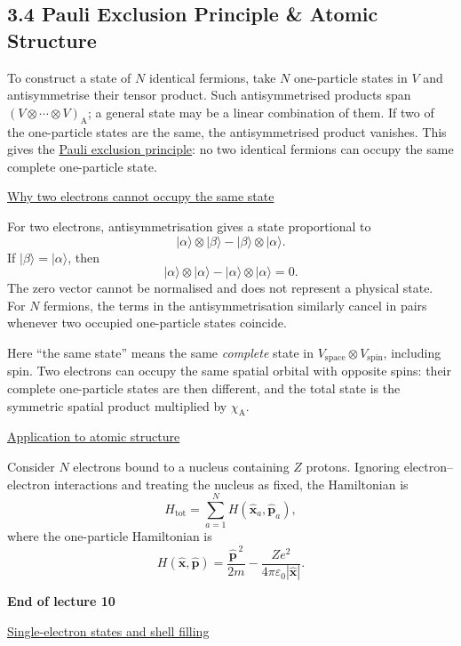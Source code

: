 \documentclass[11pt,a4paper]{article}
\begin{document}
\subsection*{3.4 Pauli Exclusion Principle \& Atomic Structure}

To construct a state of $N$ identical fermions, take $N$ one-particle
states in $V$ and antisymmetrise their tensor product. Such
antisymmetrised products span
$(V\otimes\cdots\otimes V)_{\mathrm{A}}$; a general state may be a
linear combination of them. If two of the one-particle states are
the same, the antisymmetrised product vanishes. This gives the
\underline{Pauli exclusion principle}: no two identical fermions can
occupy the same complete one-particle state.

\medskip
\noindent
\underline{Why two electrons cannot occupy the same state}

For two electrons, antisymmetrisation gives a state proportional to
\[
    |\alpha\rangle\otimes|\beta\rangle
        -|\beta\rangle\otimes|\alpha\rangle.
\]
If $|\beta\rangle=|\alpha\rangle$, then
\[
    |\alpha\rangle\otimes|\alpha\rangle
        -|\alpha\rangle\otimes|\alpha\rangle=0.
\]
The zero vector cannot be normalised and does not represent a physical
state. For $N$ fermions, the terms in the antisymmetrisation similarly
cancel in pairs whenever two occupied one-particle states coincide.

Here ``the same state'' means the same \emph{complete} state in
$V_{\mathrm{space}}\otimes V_{\mathrm{spin}}$, including spin.
Two electrons can occupy the same spatial orbital with opposite spins:
their complete one-particle states are then different, and the total
state is the symmetric spatial product multiplied by
$\chi_{\mathrm{A}}$.

\medskip
\noindent
\underline{Application to atomic structure}

Consider $N$ electrons bound to a nucleus containing $Z$ protons.
Ignoring electron--electron interactions and treating the nucleus as
fixed, the Hamiltonian is
\[
    H_{\mathrm{tot}}=\sum_{a=1}^{N}
       H(\hat{\mathbf{x}}_a,\hat{\mathbf{p}}_a),
\]
where the one-particle Hamiltonian is
\[
    H(\hat{\mathbf{x}},\hat{\mathbf{p}})
       =\frac{\hat{\mathbf{p}}^{\,2}}{2m}
        -\frac{Ze^2}{4\pi\varepsilon_0|\hat{\mathbf{x}}|}.
\]

\begin{center}
    \textbf{End of lecture 10}
\end{center}

\medskip
\noindent
\underline{Single-electron states and shell filling}
\end{document}
